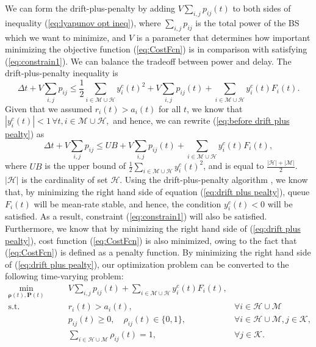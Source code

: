 \documentclass[journal,draftclsnofoot,onecolumn,12pt]{IEEEtran}%
\newcommand{\rhob}{\boldsymbol{\rho}}
\newcommand{\Pb}{\boldsymbol{P}}
\begin{document}
We can form the drift-plus-penalty by adding $V\sum_{i,j}p_{ij}(t)$ to both sides of  inequality (\ref{eq:lyapunov opt ineq}), where $\sum_{i,j}p_{ij}$ is the total power of the BS which we want to minimize, and $V$ is a parameter that determines how important minimizing the objective function (\ref{eq:CostFcn}) is in comparison with satisfying (\ref{eq:constrain1}). We can balance the tradeoff between power and delay. The drift-plus-penalty inequality is 
{\begin{equation}\label{eq:before drift plus pealty}
\Delta t +V\sum_{i,j}p_{ij}\leq \frac{1}{2}\sum_{i\in \mathcal{M} \cup \mathcal{H}}y^c_i(t)^2+V\sum_{i,j}p_{ij}(t)+\sum_{i\in \mathcal{M} \cup \mathcal{H}}y^c_i(t)F_i(t).
\end{equation}}
Given that we assumed $r_i(t)>a_i(t)$ for all $t$, we know that {
$
|y^c_i(t)|<1 \, \forall t, i \in \mathcal{M} \cup \mathcal{H},
$}
and hence, we can rewrite (\ref{eq:before drift plus pealty}) as
{\begin{equation}\label{eq:drift plus pealty}
\Delta t +V\sum_{i,j}p_{ij}\leq UB+V\sum_{i,j}p_{ij}(t)+\sum_{i\in \mathcal{M} \cup \mathcal{H}}y^c_i(t)F_i(t),
\end{equation}}
where {$UB$} is the upper bound of {$\frac{1}{2}\sum_{i\in \mathcal{M} \cup \mathcal{H}}y^c_i(t)^2$}, and is equal to $\frac{|\mathcal{H}|+|\mathcal{M}|}{2}$. $|\mathcal{H}|$ is the cardinality of  set $\mathcal{H}$. Using the drift-plus-penalty algorithm \cite{neely2008fairness}, we know that, by minimizing the right hand side of equation (\ref{eq:drift plus pealty}),   queue $F_i(t)$ will be mean-rate stable, and hence, the condition { $y^c_i(t)<0$} will be satisfied. As a result, constraint (\ref{eq:constrain1}) will also be  satisfied. Furthermore, we know that by minimizing the right hand side of (\ref{eq:drift plus pealty}), cost function (\ref{eq:CostFcn}) is also minimized, owing to the fact that (\ref{eq:CostFcn}) is defined as a penalty function.
By minimizing the right hand side of (\ref{eq:drift plus pealty}), our optimization problem can be converted to the following time-varying problem:
{
\begin{subequations}\label{eq:converted optimization problem}
	\begin{align}
	\min_{\rhob(t),\Pb(t)} \qquad &V\sum_{i,j}p_{ij}(t)+\sum_{i\in \mathcal{M} \cup \mathcal{H}}y^c_i(t)F_i(t), \label{eq:converted cost func}\\
	\text{s.t.} \qquad &r_i(t)>a_i(t), \quad  &\forall i \in \mathcal{H} \cup \mathcal{M} \label{eq:converted constrain 1}\\
	&p_{ij}(t) \geq 0,\quad \rho_{ij}(t) \in \{0,1\}, \quad  &\forall i \in \mathcal{H} \cup \mathcal{M}, j\in \mathcal{K},\label{eq:converted constrain 2}\\
     &\sum_{i \in \mathcal{H} \cup \mathcal{M}}\rho_{ij}(t)=1, \quad&\forall j\in \mathcal{K}\label{eq:converted constrain 4}.
	\end{align}
\end{subequations}
}
\end{document}
